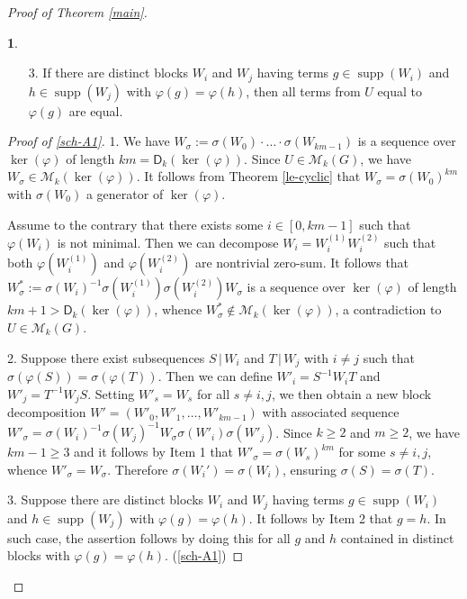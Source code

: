 \documentclass[11pt]{amsart}
\theoremstyle{definition}
\newtheorem{claim}{}[theorem]
\DeclareMathOperator{\supp}{supp}
\renewcommand{\t}{\, | \,}
\numberwithin{equation}{section}
\begin{document}
\begin{proof}[Proof of Theorem \ref{main}]
\begin{claim}
\begin{enumerate}
			\item[3.] If there are distinct blocks $W_i$ and $W_j$ having terms $g\in \supp(W_i)$ and $h\in \supp(W_j)$ with $\varphi(g)=\varphi(h)$, then  
			all terms from $U$ equal to $\varphi(g)$ are equal.
		\end{enumerate}
	\end{claim}
	\begin{proof}[Proof of \ref{sch-A1}]
		1. We have $W_{\sigma}:=\sigma(W_0)\cdot\ldots\cdot \sigma(W_{km-1})$ is a sequence over $\ker(\varphi)$ of length $km=\mathsf D_k(\ker(\varphi))$. Since $U\in \mathcal M_k(G)$, we have $W_{\sigma}\in \mathcal M_k(\ker(\varphi))$.
		It follows from Theorem \ref{le-cyclic} that $W_{\sigma}=\sigma(W_0)^{km}$ with $\sigma(W_0)$  a generator of $\ker(\varphi)$.
		
		Assume to the contrary that there exists some $i\in [0, km-1]$ such that $\varphi(W_i)$ is not minimal. Then we can decompose $W_i=W_i^{(1)}W_i^{(2)}$ such that both $\varphi(W_i^{(1)})$ and  $\varphi(W_i^{(2)})$ are nontrivial zero-sum. It follows that $W_{\sigma}^*:=\sigma({W_i})^{-1}\sigma(W_i^{(1)})\sigma(W_i^{(2)})W_{\sigma}$ is a sequence over $\ker(\varphi)$ of length $km+1>\mathsf D_k(\ker(\varphi))$, whence $W_{\sigma}^*\not\in \mathcal M_k(\ker(\varphi))$, a contradiction to  $U\in \mathcal M_k(G)$.
		
		2. Suppose there exist subsequences $S\t W_i$ and $T\t W_j$ with $i\neq j$ such that $\sigma(\varphi(S))=\sigma(\varphi(T))$. Then 
		 we can define $W'_i=S^{-1} W_i T$ and $W'_j=T^{-1} W_j S$. Setting $W'_s=W_s$ for all $s\neq i,j$, we then obtain a new  block decomposition $W'=(W'_0,W'_1,\ldots,W'_{km-1})$ with associated sequence $W'_\sigma=\sigma(W_i)^{-1} \sigma(W_j)^{-1} W_\sigma \sigma(W'_i) \sigma(W'_j)$. Since $k\ge 2$ and $m\ge 2$, we have $km-1\ge 3$ and it follows by Item 1 that $W'_{\sigma}=\sigma(W_s)^{km}$ for some $s\neq i,j$, whence $W'_{\sigma}=W_{\sigma}$. Therefore $\sigma(W_i')=\sigma(W_i)$, ensuring $\sigma(S)=\sigma(T)$.
		
		3. Suppose there are distinct blocks $W_i$ and $W_j$ having terms $g\in \supp(W_i)$ and $h\in \supp(W_j)$ with $\varphi(g)=\varphi(h)$. It follows by Item 2  that $g=h$. In such case, the assertion follows by doing this for all $g$ and $h$ contained in distinct blocks with $\varphi(g)=\varphi(h)$.
		\qedhere (\ref{sch-A1})
	\end{proof}
	
	
	
	
	

\end{proof}
\end{document}
